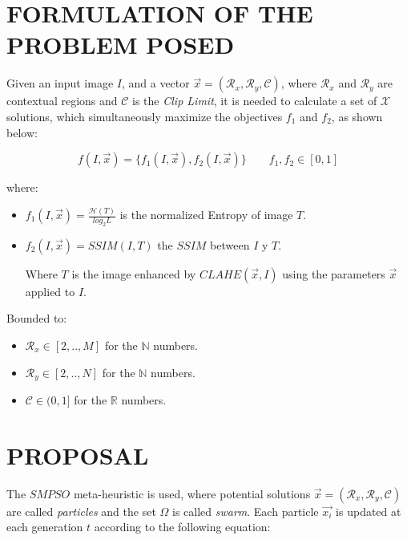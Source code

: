 \documentclass[spanish,twocolumn]{article}
\begin{document}
\section{FORMULATION OF THE PROBLEM POSED}
\label{sec:formulacion}

Given an input image $I$, and a vector $\overrightarrow{x}=(\mathcal{R}_x, \mathcal{R}_y, \mathcal{C})$, where $\mathcal{R}_x$ and $\mathcal{R}_y$ are contextual regions and $\mathscr{C}$ is the {\it Clip Limit}, it is needed to calculate a set of $\mathscr{X}$ solutions, which simultaneously maximize the objectives $f_1$ and $f_2$, as shown below:

\begin{equation}\label{eq:fitness}
    f(I, \overrightarrow{x}) = \{ f_1(I, \overrightarrow{x}), f_2(I, \overrightarrow{x}) \} \qquad f_1,f_2 \in [0,1]
\end{equation}

where:
\begin{itemize}
\item $f_{1}(I, \overrightarrow{x})=\frac{\mathscr{H}(T)}{log_{2}L}$ is the normalized Entropy of image $T$.
\item $f_{2}(I, \overrightarrow{x})=SSIM(I,T)$ the $SSIM$ between $I$ y $T$.

Where $T$ is the image enhanced by $CLAHE(\overrightarrow{x},I)$ using the parameters $\overrightarrow{x}$ applied to $I$.

\end{itemize}

Bounded to:

\begin{itemize}
\item $\mathcal{R}_x \in [2,..,M]$ for the $\mathbb{N}$ numbers.
\item $\mathcal{R}_y \in [2,..,N]$ for the $\mathbb{N}$ numbers.
\item $\mathscr{C} \in (0,1]$ for the $\mathbb{R}$ numbers.
\end{itemize}

\section{PROPOSAL}
\label{sec:propuesta}

The $SMPSO$ \cite{4938830} meta-heuristic is used, where potential solutions $\overrightarrow{x}=(\mathcal{R}_x, \mathcal{R}_y, \mathcal{C})$  are called {\it particles} and the set $\Omega$ is called {\it swarm}. Each particle $\overrightarrow{x_i}$ is updated at each generation $t$ according to the following equation:
\end{document}
